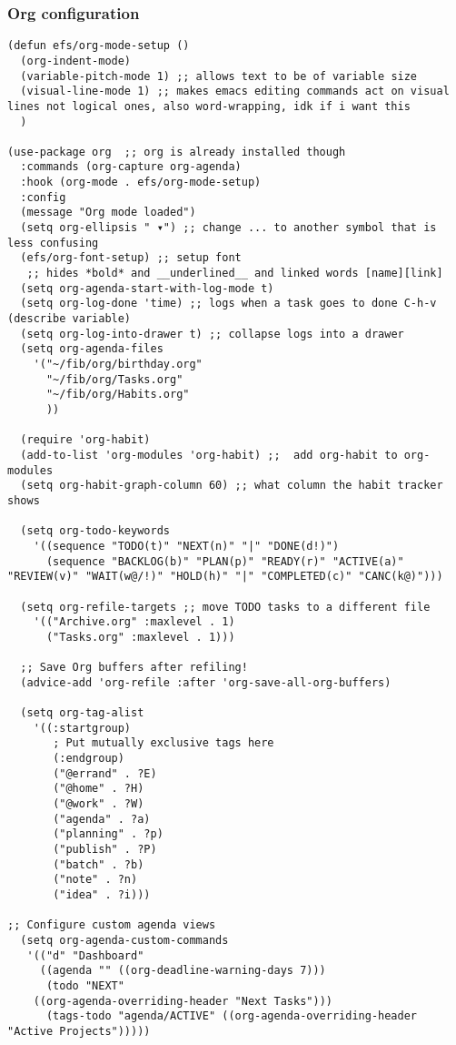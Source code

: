 \documentclass[11pt]{article}
\begin{document}
\subsubsection{Org configuration}
\label{sec:orgc470e09}
\begin{verbatim}
(defun efs/org-mode-setup ()
  (org-indent-mode)
  (variable-pitch-mode 1) ;; allows text to be of variable size
  (visual-line-mode 1) ;; makes emacs editing commands act on visual lines not logical ones, also word-wrapping, idk if i want this
  )

(use-package org  ;; org is already installed though
  :commands (org-capture org-agenda)
  :hook (org-mode . efs/org-mode-setup)
  :config
  (message "Org mode loaded")
  (setq org-ellipsis " ▾") ;; change ... to another symbol that is less confusing
  (efs/org-font-setup) ;; setup font
   ;; hides *bold* and __underlined__ and linked words [name][link]
  (setq org-agenda-start-with-log-mode t)
  (setq org-log-done 'time) ;; logs when a task goes to done C-h-v (describe variable)
  (setq org-log-into-drawer t) ;; collapse logs into a drawer
  (setq org-agenda-files
	'("~/fib/org/birthday.org"
	  "~/fib/org/Tasks.org"
	  "~/fib/org/Habits.org"
	  ))

  (require 'org-habit)
  (add-to-list 'org-modules 'org-habit) ;;  add org-habit to org-modules
  (setq org-habit-graph-column 60) ;; what column the habit tracker shows

  (setq org-todo-keywords
    '((sequence "TODO(t)" "NEXT(n)" "|" "DONE(d!)")
      (sequence "BACKLOG(b)" "PLAN(p)" "READY(r)" "ACTIVE(a)" "REVIEW(v)" "WAIT(w@/!)" "HOLD(h)" "|" "COMPLETED(c)" "CANC(k@)")))

  (setq org-refile-targets ;; move TODO tasks to a different file
    '(("Archive.org" :maxlevel . 1)
      ("Tasks.org" :maxlevel . 1)))

  ;; Save Org buffers after refiling!
  (advice-add 'org-refile :after 'org-save-all-org-buffers)

  (setq org-tag-alist
    '((:startgroup)
       ; Put mutually exclusive tags here
       (:endgroup)
       ("@errand" . ?E)
       ("@home" . ?H)
       ("@work" . ?W)
       ("agenda" . ?a)
       ("planning" . ?p)
       ("publish" . ?P)
       ("batch" . ?b)
       ("note" . ?n)
       ("idea" . ?i)))

;; Configure custom agenda views
  (setq org-agenda-custom-commands
   '(("d" "Dashboard"
     ((agenda "" ((org-deadline-warning-days 7)))
      (todo "NEXT"
	((org-agenda-overriding-header "Next Tasks")))
      (tags-todo "agenda/ACTIVE" ((org-agenda-overriding-header "Active Projects")))))


\end{verbatim}
\end{document}
